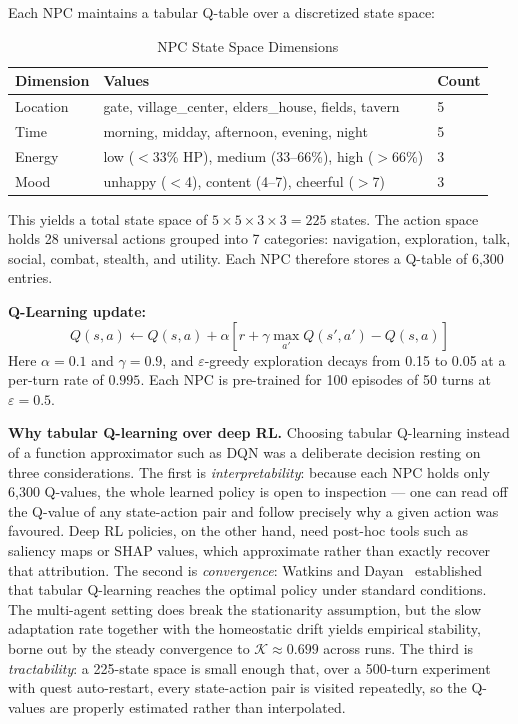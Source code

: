 \documentclass[12pt, a4paper, oneside]{report}
\begin{document}
Each NPC maintains a tabular Q-table over a discretized state space:

\begin{table}[H]
\centering
\caption{NPC State Space Dimensions}
\label{tab:state_space}
\begin{tabular}{lll}
\toprule
\textbf{Dimension} & \textbf{Values} & \textbf{Count} \\
\midrule
Location & gate, village\_center, elders\_house, fields, tavern & 5 \\
Time & morning, midday, afternoon, evening, night & 5 \\
Energy & low ($<$33\% HP), medium (33--66\%), high ($>$66\%) & 3 \\
Mood & unhappy ($<$4), content (4--7), cheerful ($>$7) & 3 \\
\bottomrule
\end{tabular}
\end{table}

This yields a total state space of $5 \times 5 \times 3 \times 3 = 225$ states. The action space holds 28 universal actions grouped into 7 categories: navigation, exploration, talk, social, combat, stealth, and utility. Each NPC therefore stores a Q-table of 6,300 entries.

\textbf{Q-Learning update:}
\begin{equation}
    Q(s, a) \leftarrow Q(s, a) + \alpha \left[ r + \gamma \max_{a'} Q(s', a') - Q(s, a) \right]
\end{equation}
Here $\alpha = 0.1$ and $\gamma = 0.9$, and $\varepsilon$-greedy exploration decays from 0.15 to 0.05 at a per-turn rate of $0.995$. Each NPC is pre-trained for 100 episodes of 50 turns at $\varepsilon = 0.5$.

\textbf{Why tabular Q-learning over deep RL.}
Choosing tabular Q-learning instead of a function approximator such as DQN was a deliberate decision resting on three considerations. The first is \emph{interpretability}: because each NPC holds only 6,300 Q-values, the whole learned policy is open to inspection --- one can read off the Q-value of any state-action pair and follow precisely why a given action was favoured. Deep RL policies, on the other hand, need post-hoc tools such as saliency maps or SHAP values, which approximate rather than exactly recover that attribution. The second is \emph{convergence}: Watkins and Dayan~\cite{watkins1992qlearning} established that tabular Q-learning reaches the optimal policy under standard conditions. The multi-agent setting does break the stationarity assumption, but the slow adaptation rate together with the homeostatic drift yields empirical stability, borne out by the steady convergence to $\mathcal{K} \approx 0.699$ across runs. The third is \emph{tractability}: a 225-state space is small enough that, over a 500-turn experiment with quest auto-restart, every state-action pair is visited repeatedly, so the Q-values are properly estimated rather than interpolated.
\end{document}
